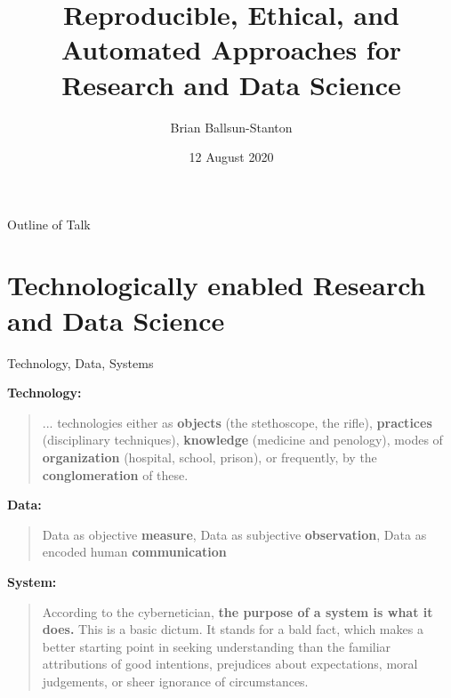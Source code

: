 \documentclass[aspectratio=1610, 11pt]{beamer} %
\title{Reproducible, Ethical, and Automated Approaches for Research and Data Science} %
\author{Brian Ballsun-Stanton}               %
\institute{Faculty of Arts}         %
\date{12 August 2020}                 %
\begin{document}
\maketitle


\begin{frame}{Outline of Talk}
  \tableofcontents
\end{frame}



\section{Technologically enabled Research and Data Science}

\begin{frame}{Technology, Data, Systems}

\textbf{Technology:} \begin{quote}
... technologies either as
\textbf{objects} (the stethoscope, the rifle), \textbf{practices} (disciplinary techniques), \textbf{knowledge} (medicine and penology), modes of \textbf{organization} (hospital, school, prison), or frequently,
by the \textbf{conglomeration} of these. \parencite{Lagdameo2019-sa}
\end{quote} 

\textbf{Data:}
\begin{quote}
Data as objective \textbf{measure}, Data as subjective \textbf{observation}, Data as encoded human \textbf{communication} \parencite{Ballsun-Stanton2012-nx}
\end{quote}

\textbf{System:}
\begin{quote}
According to the
cybernetician, \textbf{the purpose of a system is what it does.} This is a basic dictum. It stands for a
bald fact, which makes a better starting point in seeking understanding than the familiar
attributions of good intentions, prejudices about expectations, moral judgements, or sheer
ignorance of circumstances. \parencite{Beer2002-tl}
\end{quote} 
\end{frame}
\end{document}
